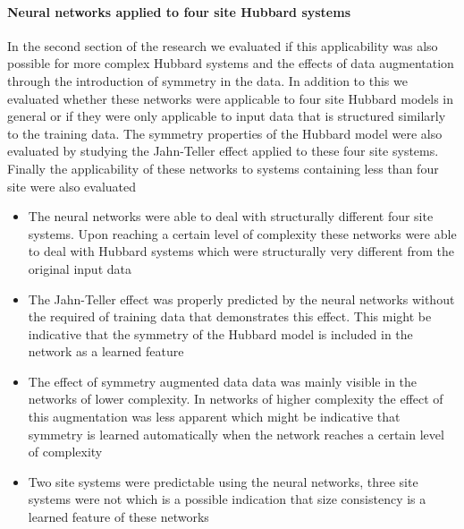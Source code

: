 \documentclass[12pt]{article}
\begin{document}
\paragraph{Neural networks applied to four site Hubbard systems}
In the second section of the research we evaluated if this applicability was also possible for more complex Hubbard systems and the effects of data augmentation through the introduction of symmetry in the data. In addition to this we evaluated whether these networks were applicable to four site Hubbard models in general or if they were only applicable to input data that is structured similarly to the training data. The symmetry properties of the Hubbard model were also evaluated by studying the Jahn-Teller effect applied to these four site systems. Finally the applicability of these networks to systems containing less than four site were also evaluated
\begin{itemize}
	\item The neural networks were able to deal with structurally different four site systems. Upon reaching a certain level of complexity these networks were able to deal with Hubbard systems which were structurally very different from the original input data
	\item The Jahn-Teller effect was properly predicted by the neural networks without the required of training data that demonstrates this effect. This might be indicative that the symmetry of the Hubbard model is included in the network as a learned feature
	\item The effect of symmetry augmented data data was mainly visible in the networks of lower complexity. In networks of higher complexity the effect of this augmentation was less apparent which might be indicative that symmetry is learned automatically when the network reaches a certain level of complexity
	\item Two site systems were predictable using the neural networks, three site systems were not which is a possible indication that size consistency is a learned feature of these networks  
\end{itemize} 
\end{document}
